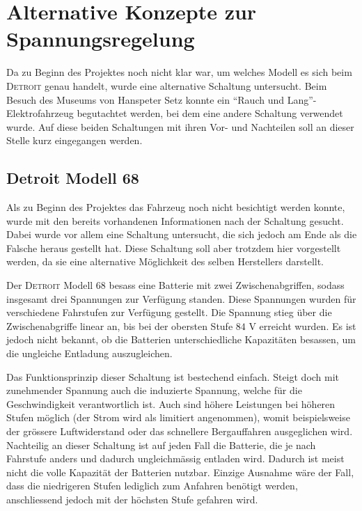 \section{Alternative Konzepte zur Spannungsregelung}
Da zu Beginn des Projektes noch nicht klar war, um welches Modell es sich beim \textsc{Detroit} genau handelt, wurde eine alternative Schaltung untersucht. Beim Besuch des Museums von Hanspeter Setz konnte ein "`Rauch und Lang"'-Elektrofahrzeug begutachtet werden, bei dem eine andere Schaltung verwendet wurde. Auf diese beiden Schaltungen mit ihren Vor- und Nachteilen soll an dieser Stelle kurz eingegangen werden.

\subsection{Detroit Modell 68}
Als zu Beginn des Projektes das Fahrzeug noch nicht besichtigt werden konnte, wurde mit den bereits vorhandenen Informationen nach der Schaltung gesucht. Dabei wurde vor allem eine Schaltung untersucht, die sich jedoch am Ende als die Falsche heraus gestellt hat. Diese Schaltung soll aber trotzdem hier vorgestellt werden, da sie eine alternative Möglichkeit des selben Herstellers darstellt.

\newpage

Der \textsc{Detroit} Modell 68 besass eine Batterie mit zwei Zwischenabgriffen, sodass insgesamt drei Spannungen zur Verfügung standen. Diese Spannungen wurden für verschiedene Fahrstufen zur Verfügung gestellt. Die Spannung stieg über die Zwischenabgriffe linear an, bis bei der obersten Stufe $84$ V erreicht wurden. Es ist jedoch nicht bekannt, ob die Batterien unterschiedliche Kapazitäten besassen, um die ungleiche Entladung auszugleichen.

Das Funktionsprinzip dieser Schaltung ist bestechend einfach. Steigt doch mit zunehmender Spannung auch die induzierte Spannung, welche für die Geschwindigkeit verantwortlich ist. Auch sind höhere Leistungen bei höheren Stufen möglich (der Strom wird als limitiert angenommen), womit beispielsweise der grössere Luftwiderstand oder das schnellere Bergauffahren ausgeglichen wird. Nachteilig an dieser Schaltung ist auf jeden Fall die Batterie, die je nach Fahrstufe anders und dadurch ungleichmässig entladen wird. Dadurch ist meist nicht die volle Kapazität der Batterien nutzbar. Einzige Ausnahme wäre der Fall, dass die niedrigeren Stufen lediglich zum Anfahren benötigt werden, anschliessend jedoch mit der höchsten Stufe gefahren wird.

